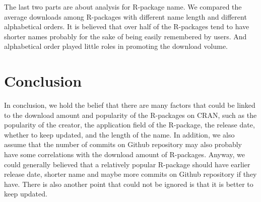 \documentclass[
]{book}
\begin{document}
The last two parts are about analysis for R-package name. We compared the average downloads among R-packages with different name length and different alphabetical orders. It is believed that over half of the R-packages tend to have shorter names probably for the sake of being easily remembered by users. And alphabetical order played little roles in promoting the download volume.

\pagebreak

\hypertarget{conclusion}{%
\chapter{Conclusion}\label{conclusion}}

In conclusion, we hold the belief that there are many factors that could be linked to the download amount and popularity of the R-packages on CRAN, such as the popularity of the creator, the application field of the R-package, the release date, whether to keep updated, and the length of the name. In addition, we also assume that the number of commits on Github repository may also probably have some correlations with the download amount of R-packages. Anyway, we could generally believed that a relatively popular R-package should have earlier release date, shorter name and maybe more commits on Github repository if they have. There is also another point that could not be ignored is that it is better to keep updated.

\printbibliography
\end{document}
